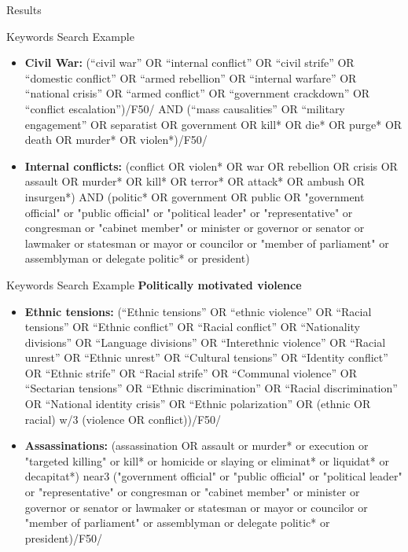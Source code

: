 \documentclass[aspectratio=169,10pt]{beamer}
\begin{document}
\begin{section}[Results]{Results}
\begin{frame}{Keywords Search Example}
\begin{itemize}
    \item \textbf{Civil War:}
(“civil war” OR “internal conflict” OR “civil strife” OR “domestic conflict” OR “armed rebellion” OR “internal warfare” OR “national crisis” OR “armed conflict” OR “government crackdown” OR “conflict escalation”)/F50/ AND (“mass causalities” OR “military engagement” OR separatist OR government OR kill* OR die* OR purge* OR death OR murder* OR violen*)/F50/

\item \textbf{Internal conflicts:}
(conflict OR violen* OR war OR rebellion OR crisis OR assault OR murder* OR kill* OR terror* OR attack* OR ambush OR insurgen*) AND (politic* OR government OR public OR "government official" or "public official" or "political leader" or "representative" or congresman or "cabinet member" or minister or governor or senator or lawmaker or statesman or mayor or councilor or "member of parliament" or assemblyman or delegate politic* or president) 

\end{itemize}

\end{frame}

\begin{frame}{Keywords Search Example}
\textbf{Politically motivated violence}
\scriptsize
\begin{itemize}

\item \textbf{Ethnic tensions:}
(“Ethnic tensions” OR “ethnic violence” OR “Racial tensions” OR “Ethnic conflict” OR “Racial conflict” OR “Nationality divisions” OR “Language divisions” OR “Interethnic violence” OR “Racial unrest” OR “Ethnic unrest” OR “Cultural tensions” OR “Identity conflict” OR “Ethnic strife” OR “Racial strife” OR “Communal violence” OR “Sectarian tensions” OR “Ethnic discrimination” OR “Racial discrimination” OR “National identity crisis” OR “Ethnic polarization” OR (ethnic OR racial) w/3 (violence OR conflict))/F50/

\item \textbf{Assassinations:}
(assassination OR assault or murder* or execution or "targeted killing" or kill* or homicide or slaying or eliminat* or liquidat* or decapitat*) near3 ("government official" or "public official" or "political leader" or "representative" or congresman or "cabinet member" or minister or governor or senator or lawmaker or statesman or mayor or councilor or "member of parliament" or assemblyman or delegate politic* or president)/F50/


\end{itemize}
\end{frame}
\end{section}
\end{document}
